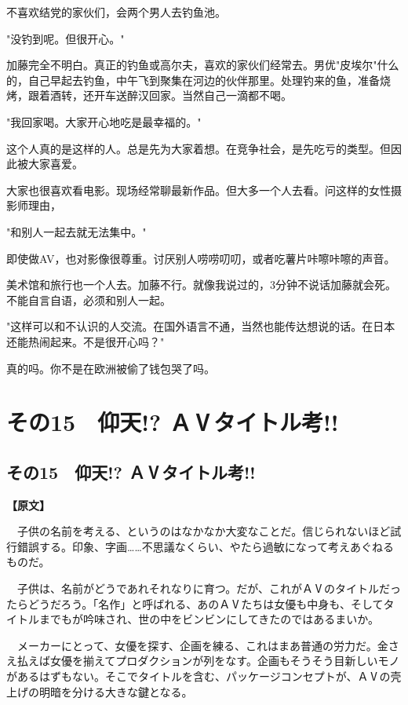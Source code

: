 \documentclass[12pt,UTF8]{ctexbook}
\begin{document}
{{不喜欢结党的家伙们，会两个男人去钓鱼池。

"没钓到呢。但很开心。"

加藤完全不明白。真正的钓鱼或高尔夫，喜欢的家伙们经常去。男优"皮埃尔"什么的，自己早起去钓鱼，中午飞到聚集在河边的伙伴那里。处理钓来的鱼，准备烧烤，跟着酒转，还开车送醉汉回家。当然自己一滴都不喝。

"我回家喝。大家开心地吃是最幸福的。"

这个人真的是这样的人。总是先为大家着想。在竞争社会，是先吃亏的类型。但因此被大家喜爱。

大家也很喜欢看电影。现场经常聊最新作品。但大多一个人去看。问这样的女性摄影师理由，

"和别人一起去就无法集中。"

即使做AV，也对影像很尊重。讨厌别人唠唠叨叨，或者吃薯片咔嚓咔嚓的声音。

美术馆和旅行也一个人去。加藤不行。就像我说过的，3分钟不说话加藤就会死。不能自言自语，必须和别人一起。

"这样可以和不认识的人交流。在国外语言不通，当然也能传达想说的话。在日本还能热闹起来。不是很开心吗？"

真的吗。你不是在欧洲被偷了钱包哭了吗。
}

\chapter{その15　仰天!? ＡⅤタイトル考!!}
\label{chap:15}

\section{その15　仰天!? ＡⅤタイトル考!!}

\vspace{1ex}
\parbox{0.9\linewidth}{
\textbf{【原文】}\par

　子供の名前を考える、というのはなかなか大変なことだ。信じられないほど試行錯誤する。印象、字画……不思議なくらい、やたら過敏になって考えあぐねるものだ。

　子供は、名前がどうであれそれなりに育つ。だが、これがＡⅤのタイトルだったらどうだろう。「名作」と呼ばれる、あのＡⅤたちは女優も中身も、そしてタイトルまでもが吟味され、世の中をビンビンにしてきたのではあるまいか。

　メーカーにとって、女優を探す、企画を練る、これはまあ普通の労力だ。金さえ払えば女優を揃えてプロダクションが列をなす。企画もそうそう目新しいモノがあるはずもない。そこでタイトルを含む、パッケージコンセプトが、ＡⅤの壳上げの明暗を分ける大きな鍵となる。

}}
\end{document}
